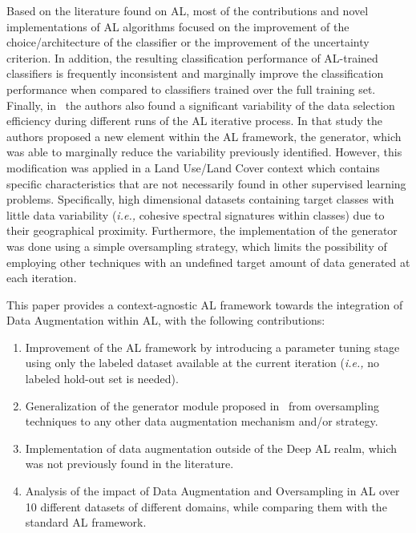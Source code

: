 \documentclass[parskip=full]{scrartcl}
\begin{document}
Based on the literature found on AL, most of the contributions and novel
implementations of AL algorithms focused on the improvement of the
choice/architecture of the classifier or the improvement of the uncertainty
criterion. In addition, the resulting classification performance of AL-trained
classifiers is frequently inconsistent and marginally improve the
classification performance when compared to classifiers trained over the full
training set. Finally, in~\cite{Fonseca2021} the authors also found a
significant variability of the data selection efficiency during different runs
of the AL iterative process. In that study the authors proposed a new element
within the AL framework, the generator, which was able to marginally reduce
the variability previously identified. However, this modification was applied
in a Land Use/Land Cover context which contains specific characteristics that
are not necessarily found in other supervised learning problems. Specifically,
high dimensional datasets containing target classes with little data
variability (\textit{i.e.,} cohesive spectral signatures within classes) due
to their geographical proximity. Furthermore, the implementation of the
generator was done using a simple oversampling strategy, which limits the
possibility of employing other techniques with an undefined target amount of
data generated at each iteration.

This paper provides a context-agnostic AL framework towards the integration of
Data Augmentation within AL, with the following contributions:

\begin{enumerate}
    \item Improvement of the AL framework by introducing a parameter
        tuning stage using only the labeled dataset available at the current
        iteration (\textit{i.e.,} no labeled hold-out set is needed).
    \item Generalization of the generator module proposed
        in~\cite{Fonseca2021} from oversampling techniques to any other data
        augmentation mechanism and/or strategy.
    \item Implementation of data augmentation outside of the Deep AL realm,
        which was not previously found in the literature.
    \item Analysis of the impact of Data Augmentation and Oversampling
        in AL over 10 different datasets of different domains, while
        comparing them with the standard AL framework.
\end{enumerate}
\end{document}
